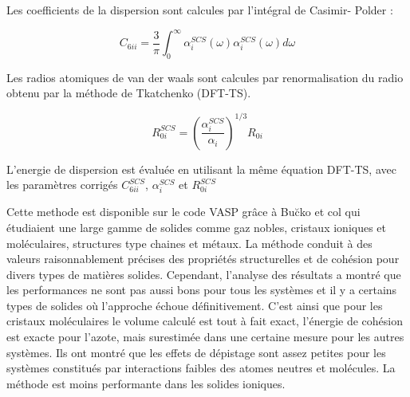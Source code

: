 	Les coefficients de la dispersion sont calcules par l'intégral de Casimir- Polder :
	
	\begin{equation}
	C_{6ii} = \frac{3}{\pi} \int_{0}^{\infty} \alpha_{i}^{SCS} (\omega) \alpha_{i}^{SCS} (\omega) d\omega
	\end{equation}
	
	Les radios atomiques de van der waals sont calcules par renormalisation du radio obtenu par la méthode de Tkatchenko (DFT-TS). 
	
	\begin{equation}
	R_{0i}^{SCS} = \left(\frac{\alpha_{i}^{SCS}}{\alpha_{i}}\right)^{1/3} R_{0i}
	\end{equation}
	
	L'energie de dispersion est évaluée en utilisant la même équation DFT-TS, avec les paramètres corrigés $C_{6ii}^{SCS}$, $\alpha_{i}^{SCS}$ et $R_{0i}^{SCS}$
	
	Cette methode est disponible sur le code VASP grâce à Bu\u{c}ko et col\cite{buvcko2013tkatchenko} qui étudiaient une large gamme de solides comme gaz nobles, cristaux ioniques et moléculaires, structures type chaines et métaux. La méthode conduit à des valeurs raisonnablement précises des propriétés structurelles et de cohésion pour divers types de matières solides. Cependant, l'analyse des résultats a montré que les performances ne sont pas aussi bons pour tous les systèmes et il y a certains types de solides où l'approche échoue définitivement. C'est ainsi que pour les cristaux moléculaires le volume calculé est tout à fait exact, l'énergie de cohésion est exacte pour l'azote, mais surestimée dans une certaine mesure pour les autres systèmes. Ils ont montré que les effets de dépistage sont assez petites pour les systèmes constitués par interactions faibles des atomes neutres et molécules. La méthode est moins performante dans les solides ioniques.